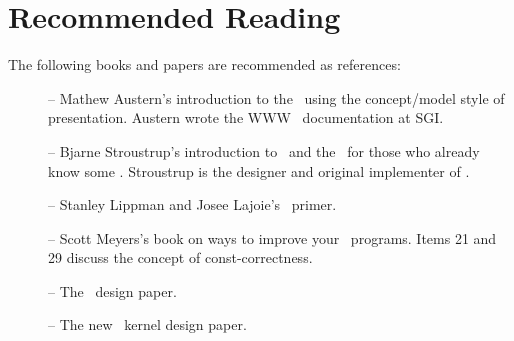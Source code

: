 
\chapter{Recommended Reading\label{chap:info}}

The following books and papers are recommended as references:

\begin{description}
   \item[\cite{cgal:a-gps-98}] --  Mathew Austern's introduction to the \stl\ 
        using the concept/model style of presentation.  Austern wrote the 
        WWW \stl\ documentation at SGI.

   \item[\cite{cgal:s-cpl-97}] -- Bjarne Stroustrup's introduction to
        \CC\ and the \stl\ for those who already know some \CC. 
        Stroustrup is the designer and original implementer of \CC.

   \item[\cite{cgal:ll-cp-98}] -- Stanley Lippman and Josee Lajoie's
     \CC\ primer.

   \item[\cite{cgal:m-ec-97}] -- Scott Meyers's book on ways to improve
        your \CC\ programs.  Items 21 and 29 discuss the concept of 
        const-correctness.

  \item [\cite{fgkss-dccga-00}] -- The \cgal\ design paper. 

  \item [\cite{hhkps-aegk-01}] -- The new \cgal\ kernel design paper. 
\end{description}

 